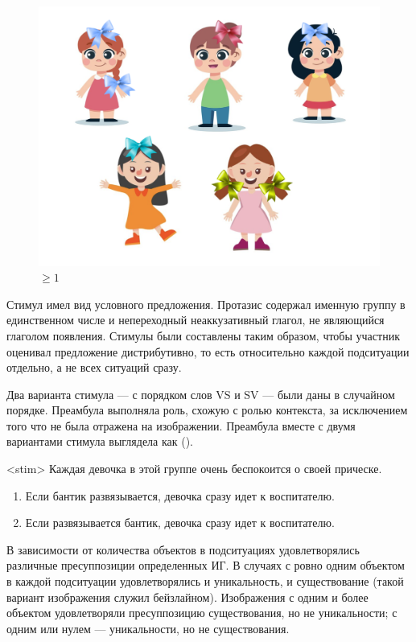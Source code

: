 \documentclass[a4paper, 12pt]{article}
\begin{document}
\begin{figure}[!htb]
\begin{minipage}{0.32\textwidth}
        \includegraphics[width=\linewidth]{images/bows_2.png}
        \caption{$\ge 1$}
    \end{minipage}\hfill
\end{figure}

Стимул имел вид условного предложения. Протазис содержал именную группу в единственном числе и непереходный неаккузативный глагол, не являющийся глаголом появления. Стимулы были составлены таким образом, чтобы участник оценивал предложение дистрибутивно, то есть относительно каждой подситуации отдельно, а не всех ситуаций сразу.

Два варианта стимула — с порядком слов VS и SV — были даны в случайном порядке. Преамбула выполняла роль, схожую с ролью контекста, за исключением того что не была отражена на изображении. Преамбула вместе с двумя вариантами стимула выглядела как (\nextx).

\pex<stim>
    Каждая девочка в этой группе очень беспокоится о своей прическе.
    \begin{enumerate}
        \item Если бантик развязывается, девочка сразу идет к воспитателю.
        \item Если развязывается бантик, девочка сразу идет к воспитателю.
    \end{enumerate}
\xe

В зависимости от количества объектов в подситуациях удовлетворялись различные пресуппозиции определенных ИГ. В случаях с ровно одним объектом в каждой подситуации удовлетворялись и уникальность, и существование (такой вариант изображения служил бейзлайном). Изображения с одним и более объектом удовлетворяли пресуппозицию существования, но не уникальности; с одним или нулем — уникальности, но не существования.
\end{document}
